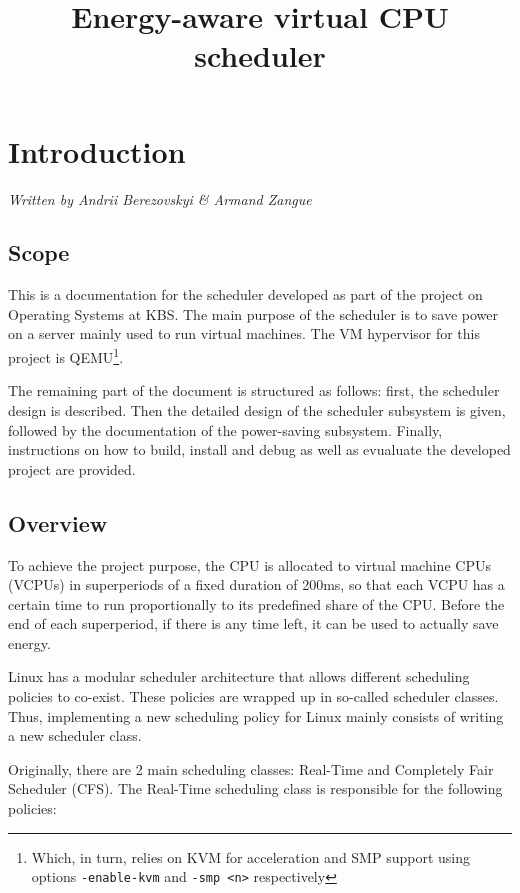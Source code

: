 \documentclass[]{report}
\title{Energy-aware virtual CPU scheduler}
\author{}
\begin{document}
\maketitle

{
\hypersetup{linkcolor=black}
\setcounter{tocdepth}{2}
\tableofcontents
}
\chapter{Introduction}\label{introduction}

\emph{Written by Andrii Berezovskyi \& Armand Zangue}

\section{Scope}\label{scope}

This is a documentation for the scheduler developed as part of the
project on Operating Systems at KBS. The main purpose of the scheduler
is to save power on a server mainly used to run virtual machines. The VM
hypervisor for this project is QEMU\footnote{Which, in turn, relies on
  KVM for acceleration and SMP support using options
  \lstinline!-enable-kvm! and \lstinline!-smp <n>! respectively}.

The remaining part of the document is structured as follows: first, the
scheduler design is described. Then the detailed design of the scheduler
subsystem is given, followed by the documentation of the power-saving
subsystem. Finally, instructions on how to build, install and debug as
well as evualuate the developed project are provided.

\section{Overview}\label{overview}

To achieve the project purpose, the CPU is allocated to virtual machine
CPUs (VCPUs) in superperiods of a fixed duration of 200ms, so that each
VCPU has a certain time to run proportionally to its predefined share of
the CPU. Before the end of each superperiod, if there is any time left,
it can be used to actually save energy.

Linux has a modular scheduler architecture that allows different
scheduling policies to co-exist. These policies are wrapped up in
so-called scheduler classes. Thus, implementing a new scheduling policy
for Linux mainly consists of writing a new scheduler class.

Originally, there are 2 main scheduling classes: Real-Time and
Completely Fair Scheduler (CFS). The Real-Time scheduling class is
responsible for the following policies:
\end{document}
